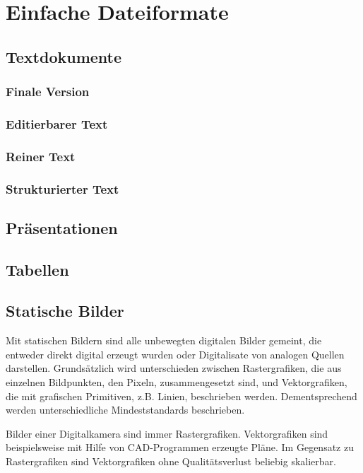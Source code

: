 \section{Einfache Dateiformate}
\subsection{Textdokumente}

\subsubsection{Finale Version}
\subsubsection{Editierbarer Text}
\subsubsection{Reiner Text}
\subsubsection{Strukturierter Text}

\subsection{Präsentationen}

\subsection{Tabellen}

\subsection{Statische Bilder}

Mit statischen Bildern sind alle unbewegten digitalen Bilder gemeint, die entweder direkt digital erzeugt wurden oder Digitalisate von analogen Quellen darstellen.
Grundsätzlich wird unterschieden zwischen Rastergrafiken, die aus einzelnen Bildpunkten, den Pixeln, zusammengesetzt sind, und Vektorgrafiken, die mit grafischen Primitiven, z.B. Linien, beschrieben werden. Dementsprechend werden unterschiedliche Mindeststandards beschrieben.

Bilder einer Digitalkamera sind immer Rastergrafiken. Vektorgrafiken sind beispielsweise mit Hilfe von CAD-Programmen erzeugte Pläne. Im Gegensatz zu Rastergrafiken sind Vektorgrafiken ohne Qualitätsverlust beliebig skalierbar.

